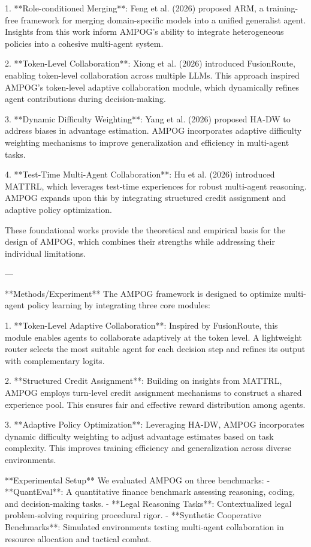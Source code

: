 1. **Role-conditioned Merging**: Feng et al. (2026) proposed ARM, a training-free framework for merging domain-specific models into a unified generalist agent. Insights from this work inform AMPOG's ability to integrate heterogeneous policies into a cohesive multi-agent system.
   
2. **Token-Level Collaboration**: Xiong et al. (2026) introduced FusionRoute, enabling token-level collaboration across multiple LLMs. This approach inspired AMPOG's token-level adaptive collaboration module, which dynamically refines agent contributions during decision-making.
   
3. **Dynamic Difficulty Weighting**: Yang et al. (2026) proposed HA-DW to address biases in advantage estimation. AMPOG incorporates adaptive difficulty weighting mechanisms to improve generalization and efficiency in multi-agent tasks.
   
4. **Test-Time Multi-Agent Collaboration**: Hu et al. (2026) introduced MATTRL, which leverages test-time experiences for robust multi-agent reasoning. AMPOG expands upon this by integrating structured credit assignment and adaptive policy optimization.

These foundational works provide the theoretical and empirical basis for the design of AMPOG, which combines their strengths while addressing their individual limitations.

---

**Methods/Experiment**  
The AMPOG framework is designed to optimize multi-agent policy learning by integrating three core modules:

1. **Token-Level Adaptive Collaboration**: Inspired by FusionRoute, this module enables agents to collaborate adaptively at the token level. A lightweight router selects the most suitable agent for each decision step and refines its output with complementary logits.

2. **Structured Credit Assignment**: Building on insights from MATTRL, AMPOG employs turn-level credit assignment mechanisms to construct a shared experience pool. This ensures fair and effective reward distribution among agents.

3. **Adaptive Policy Optimization**: Leveraging HA-DW, AMPOG incorporates dynamic difficulty weighting to adjust advantage estimates based on task complexity. This improves training efficiency and generalization across diverse environments.

**Experimental Setup**  
We evaluated AMPOG on three benchmarks:  
- **QuantEval**: A quantitative finance benchmark assessing reasoning, coding, and decision-making tasks.  
- **Legal Reasoning Tasks**: Contextualized legal problem-solving requiring procedural rigor.  
- **Synthetic Cooperative Benchmarks**: Simulated environments testing multi-agent collaboration in resource allocation and tactical combat.


